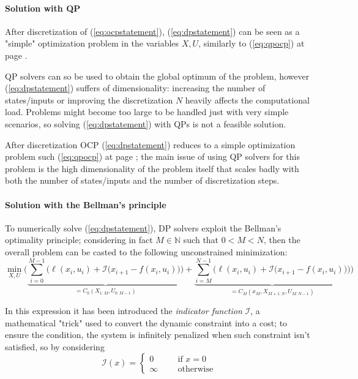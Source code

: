	\paragraph{Solution with QP} After discretization of (\ref{eq:ocpstatement}), (\ref{eq:dpstatement}) can be seen as a "simple" optimization problem in the variables $X,U$, similarly to (\ref{eq:qpocp}) at page \pageref{eq:qpocp}. 
	
	QP solvers can so be used to obtain the global optimum of the problem, however (\ref{eq:dpstatement}) suffers of dimensionality: increasing the number of states/inputs or improving the discretization $N$ heavily affects the computational load. Problems might become too large to be handled just with very simple scenarios, so solving (\ref{eq:dpstatement}) with QPs is not a feasible solution.
	
	
	After discretization OCP (\ref{eq:dpstatement}) reduces to a simple optimization problem such (\ref{eq:qpocp}) at page \pageref{eq:qpocp}; the main issue of using QP solvers for this problem is the high dimensionality of the problem itself that scales badly with both the number of states/inputs and the number of discretization steps. 
	
	\paragraph{Solution with the Bellman's principle} To numerically solve (\ref{eq:dpstatement}), DP solvers exploit the Bellman's optimality principle; considering in fact $M \in \mathds N$ such that $0 < M < N$, then the overall problem can be casted to the following unconstrained minimization:
	\[ \min_{X,U} \Bigg( \underbrace{\sum_{i=0}^{M-1} \Big( \ell(x_i,u_i) + \mathcal I\big(x_{i+1} - f(x_i,u_i)\big) \Big) }_{=C_0(X_{1:M},U_{0:M-1})} + \underbrace{\sum_{i=M}^{N-1} \Big( \ell(x_i,u_i) + \mathcal I\big(x_{i+1} - f(x_i,u_i)\big) \Big) }_{=C_M(x_M, X_{M+1:N},U_{M:N-1})} \Bigg) \tag{$\dagger$} \]
	
	In this expression it has been introduced the \textit{indicator function} $\mathcal I$, a mathematical "trick" used to convert the dynamic constraint into a cost; to ensure the condition, the system is infinitely penalized when such constraint isn't satisfied, so by considering
	\begin{equation}
		\mathcal I(x) = \begin{cases}
			0 \qquad & \textrm{if } x = 0 \\
			\infty & \textrm{otherwise}
		\end{cases}
	\end{equation}
	
